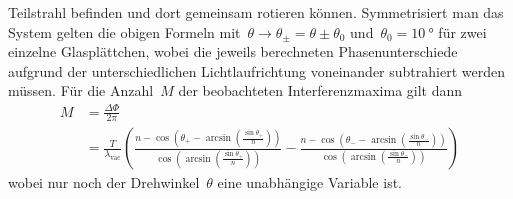 Teilstrahl befinden und dort gemeinsam rotieren können. Symmetrisiert man das
System gelten die obigen Formeln
mit~$\theta\rightarrow\theta_{\pm}=\theta\pm\theta_0$
und~$\theta_0=\SI{10}{\degree}$ für zwei einzelne Glasplättchen, wobei die
jeweils berechneten Phasenunterschiede aufgrund der unterschiedlichen
Lichtlaufrichtung voneinander subtrahiert werden müssen. Für die Anzahl~$M$ der
beobachteten Interferenzmaxima gilt dann
\begin{align}
  M&=\frac{\Delta\Phi}{2\pi} \\
  &=\frac{T}{\lambda_{\text{vac}}}\left(\frac{n-\cos\left(\theta_{+}
  -\arcsin\left(\frac{\sin\theta_{+}}{n}\right)\right)}{\cos\left(\arcsin\left(
  \frac{\sin\theta_{+}}{n}\right)\right)}-\frac{n-\cos\left(\theta_{-}-\arcsin
  \left(\frac{\sin\theta_{-}}{n}\right)\right)}{\cos\left(\arcsin\left(
  \frac{\sin\theta_{-}}{n}\right)\right)}\right)
  \label{eq:glasplättchen}
\end{align}
wobei nur noch der Drehwinkel~$\theta$ eine unabhängige Variable ist.

